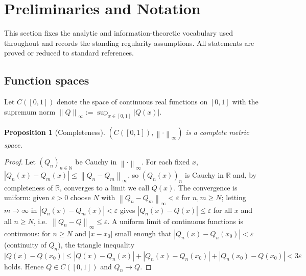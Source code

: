 \documentclass[11pt]{article}
\theoremstyle{plain}
\newtheorem{proposition}[theorem]{Proposition}
\theoremstyle{definition}
\theoremstyle{remark}
\newcommand{\R}{\mathbb{R}}
\newcommand{\N}{\mathbb{N}}
\newcommand{\norm}[1]{\left\lVert#1\right\rVert}
\newcommand{\abs}[1]{\left\lvert#1\right\rvert}
\begin{document}
\begin{abstract}
We close with an elimination ledger (making precise what cannot be concluded without additional structure) and with the spectral and contraction substructure that governs convergence rates. Every result is proved in full, reduced to a cited result of the established literature, or stated under explicitly named hypotheses, with the conditions on which it rests made explicit. The framework is metric-agnostic: it is instantiated by, but does not depend on, any particular measurement system.
\end{abstract}

\tableofcontents

\section{Preliminaries and Notation}\label{sec:prelim}

This section fixes the analytic and information-theoretic vocabulary used throughout and records the standing regularity assumptions. All statements are proved or reduced to standard references.

\subsection{Function spaces}

Let $C([0,1])$ denote the space of continuous real functions on $[0,1]$ with the supremum norm $\norm{Q}_\infty := \sup_{x\in[0,1]}\abs{Q(x)}$.

\begin{proposition}[Completeness]\label{prop:complete}
$(C([0,1]),\norm{\cdot}_\infty)$ is a complete metric space.
\end{proposition}
\begin{proof}
Let $(Q_n)_{n\in\N}$ be Cauchy in $\norm{\cdot}_\infty$. For each fixed $x$, $\abs{Q_n(x)-Q_m(x)}\le\norm{Q_n-Q_m}_\infty$, so $(Q_n(x))_n$ is Cauchy in $\R$ and, by completeness of $\R$, converges to a limit we call $Q(x)$. The convergence is uniform: given $\varepsilon>0$ choose $N$ with $\norm{Q_n-Q_m}_\infty<\varepsilon$ for $n,m\ge N$; letting $m\to\infty$ in $\abs{Q_n(x)-Q_m(x)}<\varepsilon$ gives $\abs{Q_n(x)-Q(x)}\le\varepsilon$ for all $x$ and all $n\ge N$, i.e.\ $\norm{Q_n-Q}_\infty\le\varepsilon$. A uniform limit of continuous functions is continuous: for $n\ge N$ and $\abs{x-x_0}$ small enough that $\abs{Q_n(x)-Q_n(x_0)}<\varepsilon$ (continuity of $Q_n$), the triangle inequality $\abs{Q(x)-Q(x_0)}\le\abs{Q(x)-Q_n(x)}+\abs{Q_n(x)-Q_n(x_0)}+\abs{Q_n(x_0)-Q(x_0)}<3\varepsilon$ holds. Hence $Q\in C([0,1])$ and $Q_n\to Q$.
\end{proof}
\end{document}
